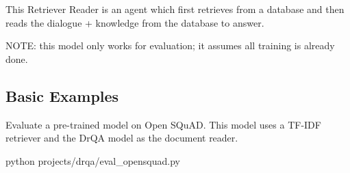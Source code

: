 This Retriever Reader is an agent which first retrieves from a database and then reads the dialogue + knowledge from the database to answer.

N\+O\+TE\+: this model only works for evaluation; it assumes all training is already done.

\subsection*{Basic Examples}

Evaluate a pre-\/trained model on Open S\+Qu\+AD. This model uses a T\+F-\/\+I\+DF retriever and the Dr\+QA model as the document reader. 
\begin{DoxyCode}
python projects/drqa/eval\_opensquad.py
\end{DoxyCode}
 